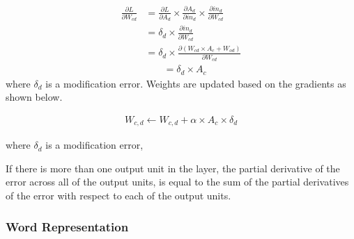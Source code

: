 \documentclass[12pt]{report} %
\begin{document}
\begin{align*} 
\frac{\partial L}{\partial W_{cd}} & = \frac{\partial L}{\partial A_{d}} \times \frac{\partial A_{d}}{\partial in_{d}} \times \frac{\partial in_{d}}{\partial W_{cd}}    \\
& = \delta_{d} \times  \frac{\partial in_{d}}{\partial W_{cd}}  \\
& = \delta_{d} \times  \frac{\partial ( W_{cd} \times A_c + W_{od})}{\partial W_{cd}}
\end{align*}
\begin{align}
& = \delta_{d} \times  A_c
\end{align}  
where $\delta_{d}$ is a modification error. Weights are updated based on the gradients as shown below.

\begin{align} 
W_{c,d} \leftarrow W_{c,d} + \alpha \times A_{c} \times \delta_{d}
\end{align}

where $\delta_{d}$ is a modification error,

%	

If there is more than one output unit in the layer, the partial derivative of the error across all of the output units, is equal to the sum of the partial derivatives of the error with respect to each of the output units.





\subsubsection{Word Representation}
\end{document}
